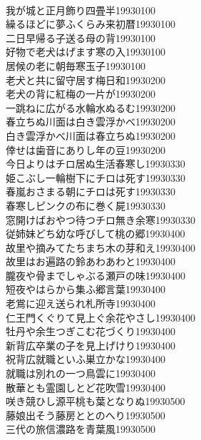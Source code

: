 \begin{multicols}{2}
\\我が城と正月飾り四畳半\hfill{19930100}
\\繰るほどに夢ふくらみ来初暦\hfill{19930100}
\\二日早帰る子送る母の背\hfill{19930100}
\\好物で老犬はげます寒の入\hfill{19930100}
\\居候の老に朝毎寒玉子\hfill{19930100}
\\老犬と共に留守居す梅日和\hfill{19930200}
\\老犬の背に紅梅の一片が\hfill{19930200}
\\一跳ねに広がる水輪水ぬるむ\hfill{19930200}
\\春立ちぬ川面は白き雲浮かべ\hfill{19930200}
\\白き雲浮かべ川面は春立ちぬ\hfill{19930200}
\\倖せは歯音にありし年の豆\hfill{19930200}
\\今日よりはチロ居ぬ生活春寒し\hfill{19930330}
\\姫こぶし一輪樹下にチロは死す\hfill{19930330}
\\春嵐おさまる朝にチロは死す\hfill{19930330}
\\春寒しピンクの布に巻く屍\hfill{19930330}
\\窓開けばおやつ待つチロ無き余寒\hfill{19930330}
\\従姉妹どち幼な呼びして桃の郷\hfill{19930400}
\\故里や摘みてたちまち木の芽和え\hfill{19930400}
\\故里はお遍路の鈴あわあわと\hfill{19930400}
\\朧夜や骨までしゃぶる瀬戸の味\hfill{19930400}
\\短夜やはらから集ふ郷言葉\hfill{19930400}
\\老鴬に迎え送られ札所寺\hfill{19930400}
\\仁王門くぐりて見上ぐ余花やさし\hfill{19930400}
\\牡丹や余生つぎこむ花づくり\hfill{19930400}
\\新背広卒業の子を見上げけり\hfill{19930400}
\\祝背広就職といふ巣立かな\hfill{19930400}
\\就職は別れの一つ鳥雲に\hfill{19930400}
\\散華とも霊園しとど花吹雪\hfill{19930400}
\\咲き競ひし源平桃も葉となりぬ\hfill{19930500}
\\藤娘出そう藤房ととのへり\hfill{19930500}
\\三代の旅信濃路を青葉風\hfill{19930500}

\end{multicols}
